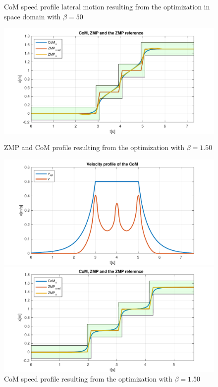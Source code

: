 \documentclass[a4paper]{article}
\begin{document}
\begin{figure}
\begin{minipage}[b]{0.48\textwidth}
        \caption{CoM speed profile lateral motion resulting from the optimization in space domain with $\beta=50$} 
        \label{fig:opt_y_50_space}
     \end{minipage} 
     \vfill
     \begin{minipage}[b]{0.48\textwidth}
         \centering
        \includegraphics[scale=0.4]{plot/OPT_TEMPO/150/opt_x_150_time_noSQD.pdf} 
         \caption{ZMP and CoM profile resulting from the optimization with $\beta=1.50$} 
         \label{fig:opt_x_150_NO_SQD}
     \end{minipage}
     \hfill
     \begin{minipage}[b]{0.48\textwidth}
         \centering
        \includegraphics[scale=0.4]{plot/OPT_TEMPO/150/v_opt_x_150_time_noSQD.pdf} 
        \caption{CoM speed profile resulting from the optimization with $\beta=1.50$} 
        \label{fig:opt_vx_150_NO_SQD}
     \end{minipage}   
     \vfill
     \begin{minipage}[b]{0.48\textwidth}
         \centering
        \includegraphics[scale=0.4]{plot/OPT_TEMPO/50/opt_x_50_time_noSQD.pdf}

\end{minipage}
\end{figure}
\end{document}

